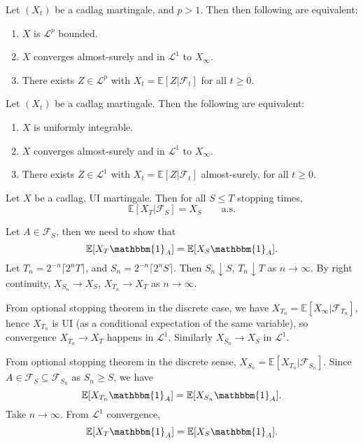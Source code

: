 \documentclass[12pt]{article}
\begin{document}
\begin{theorem}
	Let $(X_t)$ be a cadlag martingale, and $p > 1$. Then then following are equivalent:
	\begin{enumerate}[\normalfont(i)]
		\item $X$ is $\mathcal{L}^p$ bounded.
		\item $X$ converges almost-surely and in $\mathcal{L}^1$ to $X_\infty$.
		\item There exists $Z \in \mathcal{L}^p$ with $X_t = \mathbb{E}[Z | \mathcal{F}_t]$ for all $t \geq 0$.
	\end{enumerate}
\end{theorem}

\begin{theorem}
	Let $(X_t)$ be a cadlag martingale. Then the following are equivalent:
	\begin{enumerate}[\normalfont(i)]
		\item $X$ is uniformly integrable.
		\item $X$ converges almost-surely and in $\mathcal{L}^1$ to $X_\infty$.
		\item There exists $Z \in \mathcal{L}^1$ with $X_t = \mathbb{E}[Z | \mathcal{F}_t]$ almost-surely, for all $t \geq 0$.
	\end{enumerate}
\end{theorem}


\begin{theorem}
	Let $X$ be a cadlag, UI martingale. Then for all $S \leq T$ stopping times,
	\[
		\mathbb{E}[X_T | \mathcal{F}_S] = X_S \qquad\text{a.s.}
	\]
\end{theorem}

\begin{proofbox}
	Let $A \in \mathcal{F}_S$, then we need to show that
	\[
	\mathbb{E}[X_T \mathbbm{1}_{A}] = \mathbb{E}[X_S \mathbbm{1}_{A}].
	\]
	Let $T_n = 2^{-n} \lceil 2^{n} T \rceil$, and $S_n = 2^{-n} \lceil 2^{n} S \rceil$. Then $S_n \downarrow S$, $T_n \downarrow T$ as $n \to \infty$. By right continuity, $X_{S_n} \to X_S$, $X_{T_n} \to X_T$ as $n \to \infty$.

	From optional stopping theorem in the discrete case, we have $X_{T_n} = \mathbb{E}[X_\infty | \mathcal{F}_{T_n}]$, hence $X_{T_n}$ is UI (as a conditional expectation of the same variable), so convergence $X_{T_n} \to X_T$ happens in $\mathcal{L}^1$. Similarly $X_{S_n} \to X_S$ in $\mathcal{L}^1$.

	From optional stopping theorem in the discrete sense, $X_{S_n} = \mathbb{E}[X_{T_n} | \mathcal{F}_{S_n}]$. Since $A \in \mathcal{F}_S \subseteq \mathcal{F}_{S_n}$ as $S_n \geq S$, we have
	\[
	\mathbb{E}[X_{T_n} \mathbbm{1}_{A}] = \mathbb{E}[X_{S_n} \mathbbm{1}_{A}].
	\]
	Take $n \to \infty$. From $\mathcal{L}^1$ convergence,
	\[
	\mathbb{E}[X_T \mathbbm{1}_{A}] = \mathbb{E}[X_S \mathbbm{1}_{A}].
	\]
\end{proofbox}
\end{document}
